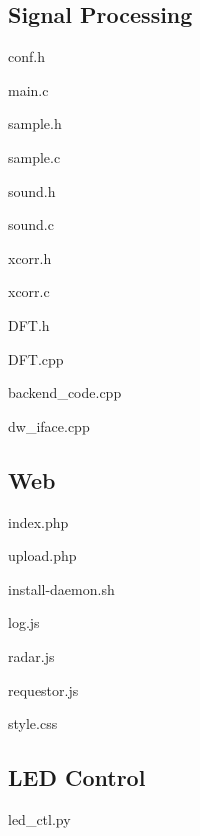 \documentclass[a4paper]{article}
\begin{document}
\subsection{Signal Processing}
conf.h


main.c


sample.h


sample.c


sound.h


sound.c


xcorr.h


xcorr.c


DFT.h


DFT.cpp


backend\_code.cpp


dw\_iface.cpp


\subsection{Web}
index.php


upload.php


install-daemon.sh


log.js


radar.js


requestor.js


style.css


\subsection{LED Control}
led\_ctl.py

\end{document}
